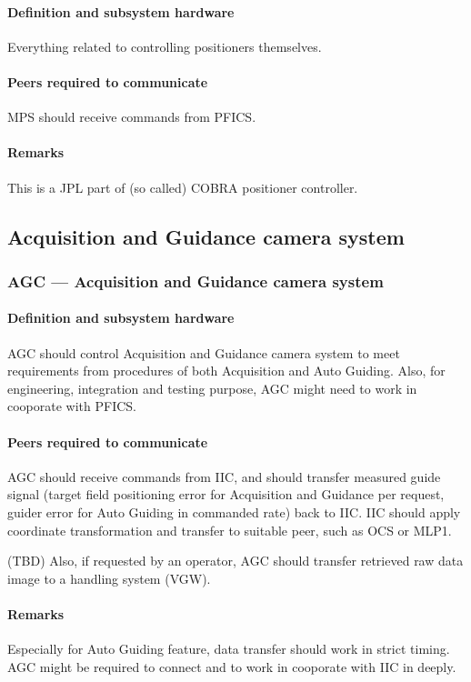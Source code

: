 \documentclass[a4paper,notitlepage]{article}
\begin{document}
\paragraph{Definition and subsystem hardware}
Everything related to controlling positioners themselves.
\paragraph{Peers required to communicate}
MPS should receive commands from PFICS. 
\paragraph{Remarks}
This is a JPL part of (so called) COBRA positioner controller.


\subsection{Acquisition and Guidance camera system}

\subsubsection{AGC --- Acquisition and Guidance camera system}
\paragraph{Definition and subsystem hardware}
AGC should control Acquisition and Guidance camera system to meet 
requirements from procedures of both Acquisition and Auto 
Guiding. 
Also, for engineering, integration and testing purpose, AGC might need to work 
in cooporate with PFICS. 
\paragraph{Peers required to communicate}
AGC should receive commands from IIC, and should transfer measured guide 
signal (target field positioning error for Acquisition and Guidance per 
request, guider error for Auto Guiding in commanded rate) back to IIC. 
IIC should apply coordinate transformation and transfer to suitable peer, 
such as OCS or MLP1. 

(TBD) Also, if requested by an operator, 
AGC should transfer retrieved raw data image to a handling system (VGW). 
\paragraph{Remarks}
Especially for Auto Guiding feature, data transfer should work in strict 
timing. 
AGC might be required to connect and to work in cooporate with IIC in deeply. 
\end{document}
